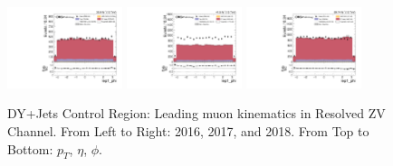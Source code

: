 \begin{figure}[!ht]
  \includegraphics[width=0.30\textwidth]{analysis_plots/2016_zjj/cr_vjets_m/lep1_phi.pdf}
  \includegraphics[width=0.30\textwidth]{analysis_plots/2017_zjj/cr_vjets_m/lep1_phi.pdf}
  \includegraphics[width=0.30\textwidth]{analysis_plots/2018_zjj/cr_vjets_m/lep1_phi.pdf} \\
  \caption[DY+Jets Control Region: Leading muon kinematics in Resolved ZV Channel]%
  {DY+Jets Control Region: Leading muon kinematics in Resolved ZV Channel. From Left to Right: 2016,
    2017, and 2018. From Top to Bottom: \( p_T \), \( \eta \), \( \phi \).}%
  \label{fig:zjj-cr-vjets-m-lep1-pt-eta-phi}
\end{figure}


